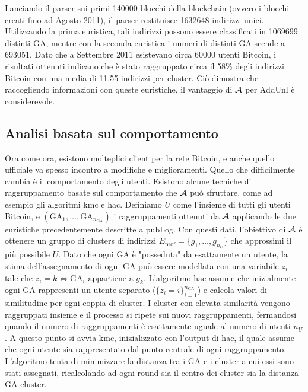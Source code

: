 Lanciando il parser sui primi 140000 blocchi della blockchain (ovvero i blocchi creati fino ad Agosto 2011), il parser restituisce 1632648 indirizzi unici.
Utilizzando la prima euristica, tali indirizzi possono essere classificati in 1069699 distinti GA, mentre con la seconda euristica i numeri di distinti GA scende a 693051.
Dato che a Settembre 2011 esistevano circa 60000 utenti Bitcoin, i risultati ottenuti indicano che è stato raggruppato circa il 58\% degli indirizzi Bitcoin con una media di 11.55 indirizzi per cluster.
Ciò dimostra che raccogliendo informazioni con queste euristiche, il vantaggio di $\mathcal{A}$ per AddUnl è considerevole.

\subsection{Analisi basata sul comportamento}

Ora come ora, esistono molteplici client per la rete Bitcoin, e anche quello ufficiale va spesso incontro a modifiche e miglioramenti.
Quello che difficilmente cambia è il comportamento degli utenti.
Esistono alcune tecniche di raggruppamento basate sul comportamento che $\mathcal{A}$ può sfruttare, come ad esempio gli algoritmi \gls{kmc} e \gls{hac}.
Definiamo $U$ come l'insieme di tutti gli utenti Bitcoin, e $\left( \text{GA}_1 , \ldots , \text{GA}_{n_\text{GA}} \right)$ i raggruppamenti ottenuti da $\mathcal{A}$ applicando le due euristiche precedentemente descritte a pubLog.
Con questi dati, l'obiettivo di $\mathcal{A}$  è ottenere un gruppo di clusters di indirizzi $E_\text{prof} = \{ g_1 , \ldots , g_{n_U} \}$ che approssimi il più possibile $U$.
Dato che ogni GA è "posseduta" da esattamente un utente, la stima dell'assegnamento di ogni GA può essere modellata con una variabile $z_i$ tale che $z_i = k \iff \text{GA}_i \text{ appartiene a } g_k$.
L'algoritmo \gls{hac} assume che inizialmente ogni GA rappresenti un utente separato ($\{ z_i = i \}^{n_\text{GA}}_{i=1}$) e calcola valori di similitudine per ogni coppia di cluster. I cluster con elevata similarità vengono raggruppati insieme e il processo si ripete sui nuovi raggruppamenti, fermandosi quando il numero di raggruppamenti è esattamente uguale al numero di utenti $n_U$.
A questo punto si avvia \gls{kmc}, inizializzato con l'output di \gls{hac}, il quale assume che ogni utente sia rappresentato dal punto centrale di ogni raggruppamento. L'algoritmo tenta di minimizzare la distanza tra i GA e i cluster a cui essi sono stati assegnati, ricalcolando ad ogni round sia il centro dei cluster sia la distanza GA-cluster.

